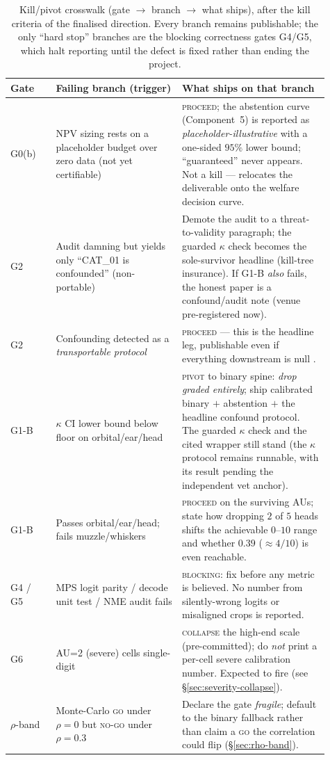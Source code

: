 \begin{table}[t]
\centering
\caption[Kill/pivot crosswalk]{Kill/pivot crosswalk (gate $\to$ branch $\to$ what
ships), after the kill criteria of the finalised direction. Every branch remains
publishable; the only ``hard stop'' branches are the blocking correctness gates
G4/G5, which halt reporting until the defect is fixed rather than ending the
project.}
\label{tab:kill-crosswalk}
\footnotesize
\begin{tabular}{@{}p{0.13\linewidth}p{0.36\linewidth}p{0.42\linewidth}@{}}
\toprule
Gate & Failing branch (trigger) & What ships on that branch \\
\midrule
G0(b) &
  NPV sizing rests on a placeholder budget over zero data (not yet certifiable) &
  \textsc{proceed}; the abstention curve (Component~5) is reported as
  \emph{placeholder-illustrative} with a one-sided $95\%$ lower bound;
  ``guaranteed'' never appears. Not a kill --- relocates the deliverable onto the
  welfare decision curve. \\[2pt]
G2 &
  Audit damning but yields only ``CAT\_01 is confounded'' (non-portable) &
  Demote the audit to a threat-to-validity paragraph; the guarded $\kappa$ check
  becomes the sole-survivor headline (kill-tree insurance). If G1-B \emph{also}
  fails, the honest paper is a confound/audit note (venue pre-registered now). \\[2pt]
G2 &
  Confounding detected as a \emph{transportable protocol} &
  \textsc{proceed} --- this is the headline leg, publishable even if everything
  downstream is null \citep{xiao2021noise,moayeri2022comprehensive}. \\[2pt]
G1-B &
  $\kappa$ CI lower bound below floor on orbital/ear/head &
  \textsc{pivot} to binary spine: \emph{drop graded entirely}; ship calibrated
  binary $+$ abstention $+$ the headline confound protocol. The guarded $\kappa$
  check and the cited wrapper still stand (the $\kappa$ protocol remains runnable,
  with its result pending the independent vet anchor). \\[2pt]
G1-B &
  Passes orbital/ear/head; fails muzzle/whiskers &
  \textsc{proceed} on the surviving AUs; state how dropping $2$ of $5$ heads
  shifts the achievable $0$--$10$ range and whether $0.39$ ($\approx 4/10$) is
  even reachable. \\[2pt]
G4 / G5 &
  MPS logit parity / decode unit test / NME audit fails &
  \textsc{blocking}: fix before any metric is believed. No number from
  silently-wrong logits or misaligned crops is reported. \\[2pt]
G6 &
  AU=2 (severe) cells single-digit &
  \textsc{collapse} the high-end scale (pre-committed); do \emph{not} print a
  per-cell severe calibration number. Expected to fire (see
  \S\ref{sec:severity-collapse}). \\[2pt]
$\rho$-band &
  Monte-Carlo \textsc{go} under $\rho=0$ but \textsc{no-go} under $\rho=0.3$ &
  Declare the gate \emph{fragile}; default to the binary fallback rather than
  claim a \textsc{go} the correlation could flip (\S\ref{sec:rho-band}). \\
\bottomrule
\end{tabular}
\end{table}

